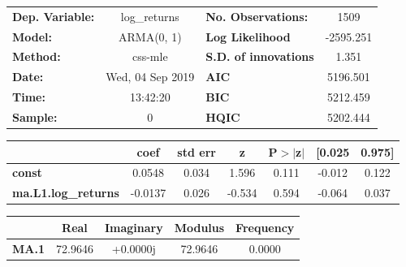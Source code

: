 \begin{center}
\begin{tabular}{lclc}
\toprule
\textbf{Dep. Variable:}     &        log\_returns       & \textbf{  No. Observations:  } &            1509            \\
\textbf{Model:}             &         ARMA(0, 1)        & \textbf{  Log Likelihood     } &         -2595.251          \\
\textbf{Method:}            &          css-mle          & \textbf{  S.D. of innovations} &           1.351            \\
\textbf{Date:}              &      Wed, 04 Sep 2019     & \textbf{  AIC                } &          5196.501          \\
\textbf{Time:}              &          13:42:20         & \textbf{  BIC                } &          5212.459          \\
\textbf{Sample:}            &             0             & \textbf{  HQIC               } &          5202.444          \\
\bottomrule
\end{tabular}
\begin{tabular}{lcccccc}
                            & \textbf{coef} & \textbf{std err} & \textbf{z} & \textbf{P$> |$z$|$} & \textbf{[0.025} & \textbf{0.975]}  \\
\midrule
\textbf{const}              &       0.0548  &        0.034     &     1.596  &         0.111        &       -0.012    &        0.122     \\
\textbf{ma.L1.log\_returns} &      -0.0137  &        0.026     &    -0.534  &         0.594        &       -0.064    &        0.037     \\
\bottomrule
\end{tabular}
\begin{tabular}{lcccc}
              & \textbf{            Real} & \textbf{         Imaginary} & \textbf{         Modulus} & \textbf{        Frequency}  \\
\midrule
\textbf{MA.1} &               72.9646     &                +0.0000j     &               72.9646     &                0.0000       \\
\bottomrule
\end{tabular}
\end{center}
